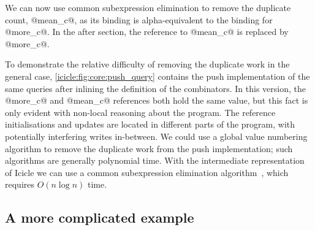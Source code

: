 We can now use common subexpression elimination to remove the duplicate count, @mean_c@, as its binding is alpha-equivalent to the binding for @more_c@.
In the after section, the reference to @mean_c@ is replaced by @more_c@.


To demonstrate the relative difficulty of removing the duplicate work in the general case, \cref{icicle:fig:core:push_query} contains the push implementation of the same queries after inlining the definition of the combinators.
In this version, the @more_c@ and @mean_c@ references both hold the same value, but this fact is only evident with non-local reasoning about the program.
The reference initialisations and updates are located in different parts of the program, with potentially interfering writes in-between.
We could use a global value numbering~\citep{gulwani2004polynomial} algorithm to remove the duplicate work from the push implementation; such algorithms are generally polynomial time.
With the intermediate representation of Icicle we can use a common subexpression elimination algorithm~\cite{chitil1997common}, which requires $O(n \log n)$ time.

\subsection{A more complicated example}

